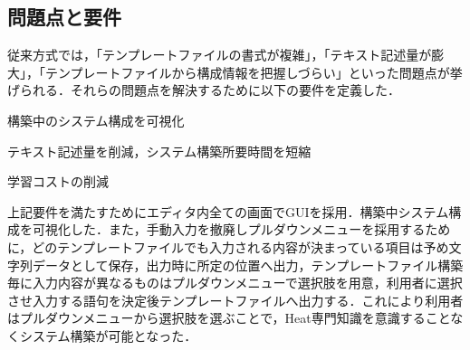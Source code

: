 \documentclass[a4j]{jarticle}
\begin{document}
\begin{Abstract}
 \subsection{問題点と要件}
 従来方式では，「テンプレートファイルの書式が複雑」，「テキスト記述量が膨大」，「テンプレートファイルから構成情報を把握しづらい」といった問題点が挙げられる．それらの問題点を解決するために以下の要件を定義した．
 \begin{description}
 	\vspace{-2mm}
 	\item[(GUIを採用)]構築中のシステム構成を可視化
 	\vspace{-2mm}
 	\item[(手動入力を撤廃)]テキスト記述量を削減，システム構築所要時間を短縮
 	\vspace{-2mm}
 	\item[(Heat専門知識の排除)]学習コストの削減
 	\vspace{-2mm}
 \end{description}
 上記要件を満たすためにエディタ内全ての画面でGUIを採用．構築中システム構成を可視化した．また，手動入力を撤廃しプルダウンメニューを採用するために，どのテンプレートファイルでも入力される内容が決まっている項目は予め文字列データとして保存，出力時に所定の位置へ出力，テンプレートファイル構築毎に入力内容が異なるものはプルダウンメニューで選択肢を用意，利用者に選択させ入力する語句を決定後テンプレートファイルへ出力する．これにより利用者はプルダウンメニューから選択肢を選ぶことで，Heat専門知識を意識することなくシステム構築が可能となった．


\end{Abstract}
\end{document}

